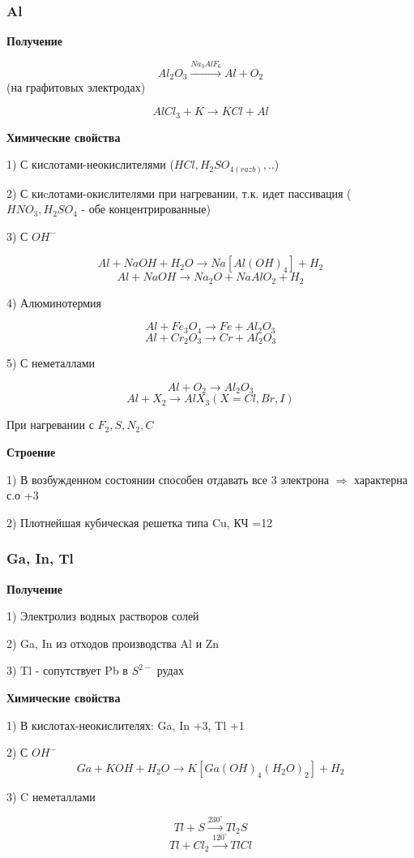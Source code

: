 \subsubsection*{Al}

\textbf{Получение}

$$Al_2O_3 \xrightarrow{Na_3AlF_6} Al + O_2$$
(на графитовых электродах)

$$AlCl_3 + K \rightarrow KCl + Al$$

\textbf{Химические свойства}

1) С кислотами-неокислителями ($HCl, H_2SO_{4(razb)},..$)

2) С киcлотами-окислителями при нагревании, т.к. идет пассивация
($HNO_3, H_2SO_4$ - обе концентрированные)

3) С $OH^-$

$$Al + NaOH + H_2O \rightarrow Na[Al(OH)_4] + H_2$$
$$Al + NaOH \rightarrow Na_2O + NaAlO_2 +H_2$$

4) Алюминотермия

$$Al + Fe_3O_4 \rightarrow Fe + Al_2O_3$$
$$ Al + Cr_2O_3 \rightarrow Cr + Al_2O_3$$

5) С неметаллами

$$Al + O_2 \rightarrow Al_2O_3$$
$$Al + X_2 \rightarrow AlX_3 (X=Cl,Br, I)$$

При нагревании с $F_2, S, N_2, C$

\textbf{Строение}

1) В возбужденном состоянии способен отдавать все 3 электрона $\Rightarrow$ характерна с.о +3

2) Плотнейшая кубическая решетка типа Cu, КЧ =12

\subsubsection*{Ga, In, Tl}

\textbf{Получение}

1) Электролиз водных растворов солей

2) Ga, In из отходов производства Al и Zn

3) Tl - сопутствует Pb в $S^{2-}$ рудах

\textbf{Химические свойства}

1) В кислотах-неокислителях: Ga, In +3, Tl +1

2) С $OH^-$
$$ Ga + KOH + H_2O \rightarrow K[Ga(OH)_4(H_2O)_2] + H_2$$

3) C неметаллами

$$Tl + S \xrightarrow{230^{\circ}} Tl_2S$$
$$Tl + Cl_2 \xrightarrow{120^{\circ}} TlCl$$


